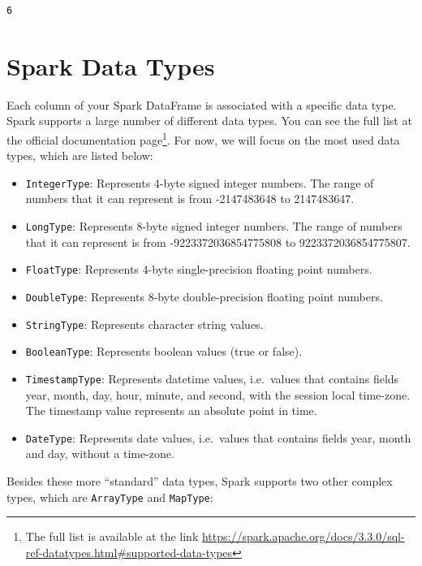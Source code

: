 \documentclass[
  11pt,
  letterpaper,
  DIV=11,
  numbers=noendperiod]{scrreprt}
\providecommand{\tightlist}{%
  \setlength{\itemsep}{0pt}\setlength{\parskip}{0pt}}\usepackage{longtable,booktabs,array}
\begin{document}
\begin{verbatim}
6
\end{verbatim}

\hypertarget{spark-data-types}{%
\section{Spark Data Types}\label{spark-data-types}}

Each column of your Spark DataFrame is associated with a specific data
type. Spark supports a large number of different data types. You can see
the full list at the official documentation page\footnote{The full list
  is available at the link
  \url{https://spark.apache.org/docs/3.3.0/sql-ref-datatypes.html\#supported-data-types}}.
For now, we will focus on the most used data types, which are listed
below:

\begin{itemize}
\tightlist
\item
  \texttt{IntegerType}: Represents 4-byte signed integer numbers. The
  range of numbers that it can represent is from -2147483648 to
  2147483647.
\item
  \texttt{LongType}: Represents 8-byte signed integer numbers. The range
  of numbers that it can represent is from -9223372036854775808 to
  9223372036854775807.
\item
  \texttt{FloatType}: Represents 4-byte single-precision floating point
  numbers.
\item
  \texttt{DoubleType}: Represents 8-byte double-precision floating point
  numbers.
\item
  \texttt{StringType}: Represents character string values.
\item
  \texttt{BooleanType}: Represents boolean values (true or false).
\item
  \texttt{TimestampType}: Represents datetime values, i.e.~values that
  contains fields year, month, day, hour, minute, and second, with the
  session local time-zone. The timestamp value represents an absolute
  point in time.
\item
  \texttt{DateType}: Represents date values, i.e.~values that contains
  fields year, month and day, without a time-zone.
\end{itemize}

Besides these more ``standard'' data types, Spark supports two other
complex types, which are \texttt{ArrayType} and \texttt{MapType}:
\end{document}
